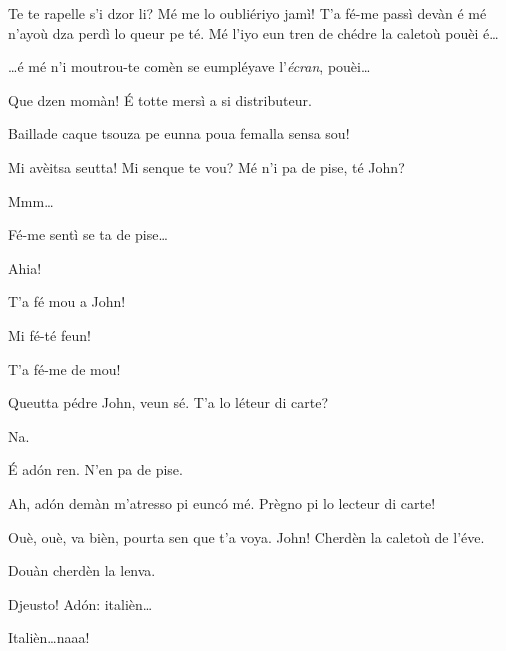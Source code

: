 \begin{drama}
\Johnspeaks Te te rapelle s'i dzor li? Mé me lo oubliériyo jamì! T'a fé-me passì devàn é mé n'ayoù dza perdì lo queur pe té. Mé l'iyo eun tren de chédre la caletoù pouèi é\ldots


\Jackspeaks \ldots é mé n'i moutrou-te comèn se eumpléyave l'\textit{écran}, pouèi\ldots


\Johnspeaks Que dzen momàn!  \'E totte mersì a si distributeur.


\Matassaspeaks Baillade caque tsouza pe eunna poua femalla sensa sou!

\Jackspeaks Mi avèitsa seutta! Mi senque te vou?  Mé n'i pa de pise, té John?

\Johnspeaks Mmm\ldots

\Jackspeaks{} Fé-me sentì se ta de pise\ldots


\Johnspeaks Ahia!

\Jackspeaks{} T'a fé mou a John! \malecha

\Prosperospeaks{} Mi fé-té feun!

\Johnspeaks T'a fé-me de mou!

\Jackspeaks Queutta pédre John, veun sé.  T'a lo léteur di carte?

\Matassaspeaks Na.

\Jackspeaks \'E ad\'on ren. N'en pa de pise.

\Matassaspeaks Ah, ad\'on demàn m'atresso pi eunc\'o mé. Prègno pi lo lecteur di carte!

\Jackspeaks  Ouè, ouè, va bièn, pourta sen que t'a voya.  John! Cherdèn la caletoù de l'éve.

\Johnspeaks Douàn cherdèn la lenva.

\Jackspeaks  Djeusto! Ad\'on: italièn\ldots

\Johnspeaks Italièn\ldots naaa!



\end{drama}
